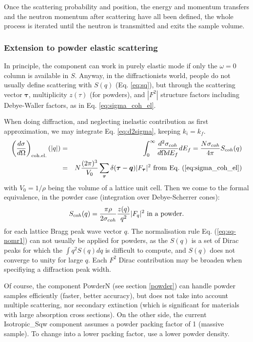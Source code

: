 Once the scattering probability and position, the energy and momentum transfers and the neutron momentum after scattering have all been defined, the whole process is iterated until the neutron is transmitted and exits the sample volume.

\subsubsection{Extension to powder elastic scattering}

In principle, the component can work in purely elastic mode if only the $\omega = 0$ column is available in $S$.
Anyway, in the diffractionists world, people do not usually define scattering with $S(q)$ (Eq. \ref{eq:sq}), but through the scattering vector $\boldsymbol{\tau}$, multiplicity $z(\tau)$ (for powders), and $|F^2|$ structure factors including Debye-Waller factors, as in Eq. \ref{eq:sigma_coh_el}.

When doing diffraction, and neglecting inelastic contribution as first approximation, we may integrate Eq. \ref{eq:d2sigma}, keeping $k_i = k_f$.
\begin{eqnarray}
\left(\frac{d\sigma}{d\Omega}\right)_{\rm coh.el.}(|q|) &=& \int_0^\infty \frac{d^2\sigma_{coh}}{d\Omega dE_f} dE_f = \frac{N \sigma_{coh}}{4\pi} S_{coh}(q) \\
& = & N\frac{(2\pi)^3}{V_0}\sum_{\boldsymbol{\tau}} \delta(\boldsymbol{\tau} - \boldsymbol{q})|F_{\boldsymbol{\tau}}|^2 {\rm\ from\ Eq.\ (\ref{eq:sigma_coh_el})}
\end{eqnarray}
with $V_0 = 1/\rho$ being the volume of a lattice unit cell. Then we come to the formal equivalence, in the powder case \cite{squires} (integration over Debye-Scherrer cones):
\begin{eqnarray}\label{eq:sq-F2}
S_{coh}(q) = \frac{\pi \rho}{2\sigma_{coh}} \frac{z(q)}{q^2} |F_q|^2 {\rm\ in\ a\ powder.}
\end{eqnarray}
for each lattice Bragg peak wave vector $q$.
The normalisation rule Eq. (\ref{eq:sq-nomr1}) can not usually be applied for powders, as the $S(q)$ is a set of Dirac peaks for which the $\int q^2 S(q) dq$ is difficult to compute, and $S(q)$ does not converge to unity for large $q$. Each $F^2$ Dirac contribution may be broaden when specifiying a diffraction peak width.

Of course, the component PowderN (see section \ref{powder}) can handle powder samples efficiently (faster, better accuracy), but does not take into account multiple scattering, nor secondary extinction (which is significant for materials with large absorption cross sections). On the other side, the current Isotropic\_Sqw component assumes a powder packing factor of 1 (massive sample). To change into a lower packing factor, use a lower powder density.

